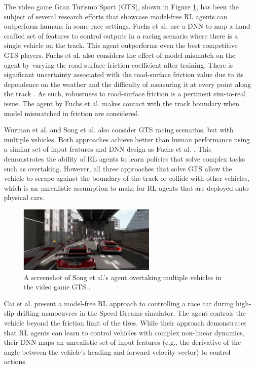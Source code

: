 The video game Gran Turismo Sport (GTS), shown in Figure \ref{fig:GTS}, has been the subject of several research efforts that showcase model-free RL agents can outperform humans \cite{Song2021, Wurman2022, Fuchs2021} in some race settings.
Fuchs et al. \cite{Fuchs2021} use a DNN to map a hand-crafted set of features to control outputs in a racing scenario where there is a single vehicle on the track.
This agent outperforms even the best competitive GTS players.
Fuchs et al. \cite{Fuchs2021} also considers the effect of model-mismatch on the agent by varying the road-surface friction coefficient after training.
There is significant uncertainty associated with the road-surface friction value due to its dependence on the weather and the difficulty of measuring it at every point along the track \cite{Novikov2018}.
As such, robustness to road-surface friction is a pertinent sim-to-real issue.
The agent by Fuchs et al. \cite{Fuchs2021} makes contact with the track boundary when model mismatched in friction are considered.

Wurman et al. \cite{Wurman2022} and Song et al. \cite{Song2021} also consider GTS racing scenarios, but with multiple vehicles.
Both approaches achieve better than human performance using a similar set of input features and DNN design as Fuchs et al. \cite{Fuchs2021}.
This demonstrates the ability of RL agents to learn policies that solve complex tasks such as overtaking. 
However, all three approaches that solve GTS allow the vehicle to scrape against the boundary of the track or collide with other vehicles, which is an unrealistic assumption to make for RL agents that are deployed onto physical cars.

\begin{figure}[htb!]
    \centering
    \includegraphics[width=0.6\textwidth]{contents/chapt2/figs/GTS.PNG}
    \caption[An RL agent overtaking multiple vehicles in GTS]{A screenshot of Song et al.'s agent overtaking multiple vehicles in the video game GTS \cite{Song2021}.}
    \label{fig:GTS}
\end{figure}

Cai et al. \cite{Cai2020} present a model-free RL approach to controlling a race car during high-slip drifting manoeuvres in the Speed Dreams simulator.
The agent controls the vehicle beyond the friction limit of the tires.
While their approach demonstrates that RL agents can learn to control vehicles with complex non-linear dynamics, their DNN maps an unrealistic set of input features (e.g., the derivative of the angle between the vehicle's heading and forward velocity vector) to control actions. 

